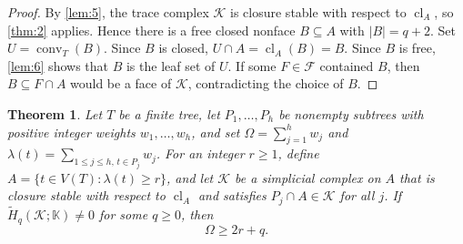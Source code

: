 \documentclass[11pt]{amsart}
\newtheorem{theorem}{Theorem}[section]
\newtheorem{corollary}[theorem]{Corollary}
\theoremstyle{definition}
\newcommand{\cl}{\operatorname{cl}}
\newcommand{\conv}{\operatorname{conv}}
\newcommand{\kk}{\mathbb K}
\begin{document}

\begin{proof}
By \cref{lem:5}, the trace complex $\mathcal K$ is closure stable with respect to $\cl_A$, so \cref{thm:2} applies. Hence there is a free closed nonface $B\subseteq A$ with $|B|=q+2$. Set $U=\conv_T(B)$. Since $B$ is closed, $U\cap A=\cl_A(B)=B$. Since $B$ is free, \cref{lem:6} shows that $B$ is the leaf set of $U$. If some $F\in\mathcal F$ contained $B$, then $B\subseteq F\cap A$ would be a face of $\mathcal K$, contradicting the choice of $B$.
\end{proof}

\begin{theorem}\label{thm:3}
Let $T$ be a finite tree, let $P_1,\dots,P_h$ be nonempty subtrees with positive integer weights $w_1,\dots,w_h$, and set $\Omega=\sum_{j=1}^h w_j$ and $\lambda(t)=\sum_{1\le j\le h,\,t\in P_j}w_j$. For an integer $r\ge1$, define $A=\{t\in V(T):\lambda(t)\ge r\}$, and let $\mathcal K$ be a simplicial complex on $A$ that is closure stable with respect to $\cl_A$ and satisfies $P_j\cap A\in\mathcal K$ for all $j$. If $\widetilde H_q(\mathcal K;\kk)\ne0$ for some $q\ge0$, then
\[
\Omega\ge2r+q.
\]
\end{theorem}
\end{document}
